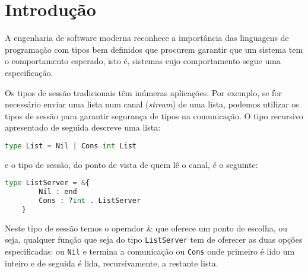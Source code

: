 
\section{Introdução}
\label{sec:intro}

A engenharia de software moderna reconhece a importância das linguagens de programação com tipos bem definidos que procurem garantir que um sistema tem o comportamento esperado, isto é, sistemas cujo comportamento segue uma especificação.


Os tipos de sessão tradicionais têm inúmeras aplicações. Por exemplo, se for necessário enviar uma lista num canal (\textit{stream}) de uma lista, podemos utilizar os tipos de sessão para garantir segurança de tipos na comunicação. O tipo recursivo apresentado de seguida descreve uma lista:
\begin{lstlisting}[language=Python]
	type List = Nil | Cons int List
\end{lstlisting}
e o tipo de sessão, do ponto de vista de quem lê o canal, é o seguinte:
\begin{lstlisting}[language=Python]
	type ListServer = &{
		Nil : end
		Cons : ?int . ListServer
	}
\end{lstlisting}

Neste tipo de sessão temos o operador \& que oferece um ponto de escolha, ou seja, qualquer função que seja do tipo \lstinline"ListServer" tem de oferecer as duas opções especificadas: ou \lstinline"Nil" e termina a comunicação ou \lstinline"Cons" onde primeiro é lido um inteiro e de seguida é lida, recursivamente, a restante lista.

